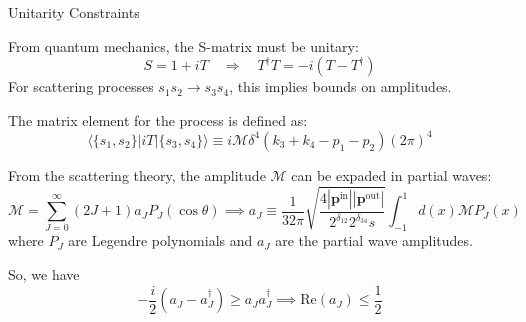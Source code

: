 \documentclass{../bredelebeamer}
\begin{document}
\begin{frame}{Unitarity Constraints}

From quantum mechanics, the S-matrix must be unitary:
\begin{equation*}
S = 1 + iT \quad \Rightarrow \quad T^\dagger T = -i(T - T^\dagger)
\end{equation*}
For scattering processes $s_1 s_2 \rightarrow s_3 s_4$, this implies bounds on amplitudes.\vfill 

The matrix element for the process is defined as:
\begin{equation*}
\langle\{s_1, s_2 \}|iT|\{s_3, s_4\}\rangle \equiv i\mathcal{M}\delta^4(k_3+k_4-p_1-p_2)(2\pi)^4
\end{equation*}

From the scattering theory, the amplitude $\mathcal{M}$ can be expaded in partial waves:
\begin{equation*}
\mathcal{M} = \sum_{J=0}^{\infty}(2J+1)a_J P_J(\cos\theta)
\implies
a_J \equiv \frac{1}{32 \pi} \sqrt{\frac{4\left|\mathbf{p}^{\text{in}}\right|\left|\mathbf{p}^{\text{out}}\right|}{2^{\delta_{12}} 2^{\delta_{34}} s}} \int_{-1}^1 d(x) \mathcal{M} P_J(x)
\end{equation*}
where $P_J$ are Legendre polynomials and $a_J$ are the partial wave amplitudes.

So, we have 
\begin{equation}
    -\frac{i}{2}\left(a_J-a_J^{\dagger}\right) \geq a_J a_J^{\dagger} 
    \implies
    \text{Re}(a_J) \leq \frac{1}{2}
\end{equation}
\end{frame}
\end{document}
